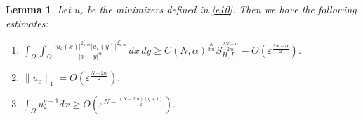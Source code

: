 \documentclass[reqno]{amsart}
\newtheorem{lemma}[theorem]{Lemma}
\newcommand{\DD} {\displaystyle}
\newcommand{\eps}{\varepsilon}
\newcommand{\Om}{\Omega}
\newcommand{\al} {\alpha}
\numberwithin{theorem}{section} \numberwithin{equation}{section}
\begin{document}
\begin{lemma}
 Let $u_\eps$ be the minimizers defined in \eqref{e10}. Then we have the following estimates:
\begin{enumerate}
\item
$\DD\int_{\Om} \DD\int_{\Om} \frac{\left|u_{\eps}(x)\right|^{2_{\al, m}^*}\left|u_{\eps}(y)\right|^{2_{\al, m}^*}}{|x-y|^\al} \, dx \, dy \geq C(N, \al)^{\frac{N}{2m}} S_{H, L}^{\frac{2N-\al}{2m}}-O\left(\eps^{\frac{2N-\al}{2}}\right)$.\\

\item $\|u_\eps \|_1= O \left(\eps^{\frac{N-2m}{2}}\right).$\\

\item $\DD\int_{\Om} u_{\eps}^{q+1} dx \geq O\left(\eps^{N-\frac{(N-2m)(q+1)}{2}}\right).$
   
\end{enumerate}
\end{lemma}
\end{document}
